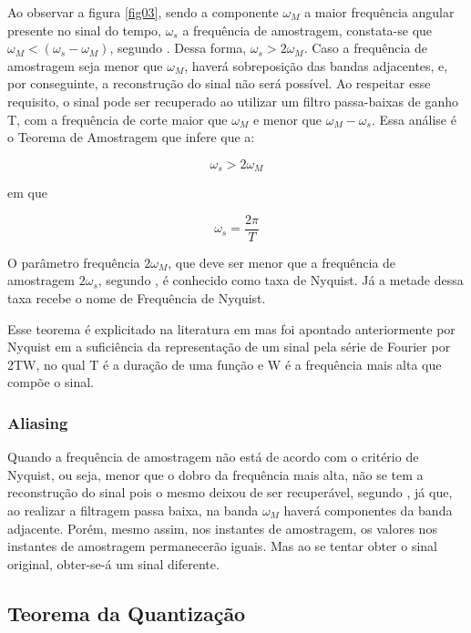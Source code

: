 Ao observar a figura \ref{fig03}, sendo a componente $\omega_M$ a maior frequência angular presente no sinal do tempo, $\omega_s$ a frequência de amostragem, constata-se que $\omega_M<(\omega_s-\omega_M)$, segundo \cite{oppenheim2010sinais}. Dessa forma, $\omega_s>2\omega_M$. Caso a frequência de amostragem seja menor que $\omega_M$, haverá sobreposição das bandas adjacentes, e, por conseguinte, a reconstrução do sinal não será possível. Ao respeitar esse requisito, o sinal pode ser recuperado ao utilizar um filtro passa-baixas de ganho T, com a frequência de corte maior que $\omega_M$ e menor que $\omega_M-\omega_s$.
Essa análise é o Teorema de Amostragem que infere que a:

\begin{equation} \label{eq:01}
\omega_s>2\omega_M
\end{equation}

em que

\begin{equation} \label{eq:02}
\omega_s=\frac{2\pi}{T}
\end{equation}

O parâmetro frequência $2\omega_M$, que deve ser menor que a frequência de amostragem  $2\omega_s$, segundo \cite{oppenheim2010sinais}, é conhecido como taxa de Nyquist. Já a metade dessa taxa recebe o nome de Frequência de Nyquist.
\par
Esse teorema é explicitado na literatura em \cite{Shannon} mas foi apontado anteriormente por Nyquist em \cite{nyquist} a suficiência da representação de um sinal pela série de Fourier por 2TW, no qual T é a duração de uma função e W é a frequência mais alta que compõe o sinal.

\subsubsection{Aliasing}
Quando a frequência de amostragem não está de acordo com o critério de Nyquist, ou seja, menor que o dobro da frequência mais alta, não se tem a reconstrução do sinal pois o mesmo deixou de ser recuperável, segundo \cite{oppenheim2010sinais}, já que, ao realizar a filtragem passa baixa, na banda $\omega_M$ haverá componentes da banda adjacente. Porém, mesmo assim, nos instantes de amostragem, os valores nos instantes de amostragem permanecerão iguais. Mas ao se tentar obter o sinal original, obter-se-á um sinal diferente.

\subsection{Teorema da Quantização}

